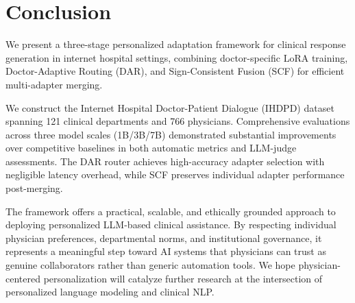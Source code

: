 ﻿\section*{Conclusion}

We present a three-stage personalized adaptation framework for clinical response generation in internet hospital settings, combining doctor-specific LoRA training, Doctor-Adaptive Routing (DAR), and Sign-Consistent Fusion (SCF) for efficient multi-adapter merging.

We construct the Internet Hospital Doctor-Patient Dialogue (IHDPD) dataset spanning 121 clinical departments and 766 physicians. Comprehensive evaluations across three model scales (1B/3B/7B) demonstrated substantial improvements over competitive baselines in both automatic metrics and LLM-judge assessments. The DAR router achieves high-accuracy adapter selection with negligible latency overhead, while SCF preserves individual adapter performance post-merging.

The framework offers a practical, scalable, and ethically grounded approach to deploying personalized LLM-based clinical assistance. By respecting individual physician preferences, departmental norms, and institutional governance, it represents a meaningful step toward AI systems that physicians can trust as genuine collaborators rather than generic automation tools. We hope physician-centered personalization will catalyze further research at the intersection of personalized language modeling and clinical NLP.



